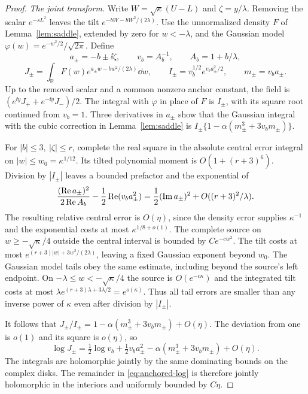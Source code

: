 \begin{proof}
\emph{The joint transform.}
Write \(W=\sqrt\kappa(U-L)\) and \(\zeta=y/\lambda\). Removing the scalar
\(e^{-sL^2}\) leaves the tilt \(e^{-bW-bW^2/(2\lambda)}\).
Use the unnormalized density \(F\) of Lemma~\ref{lem:saddle}, extended by
zero for \(w<-\lambda\), and the Gaussian model
\(\varphi(w)=e^{-w^2/2}/\sqrt{2\pi}\). Define
\[
 a_\pm=-b\pm\ii\zeta,\qquad v_b=A_b^{-1},\qquad A_b=1+b/\lambda,
\]
\[
 J_\pm=\int_{\mathbb R} F(w)e^{a_\pm w-bw^2/(2\lambda)}\dd w,
 \qquad I_\pm=v_b^{1/2}e^{v_ba_\pm^2/2},\qquad m_\pm=v_b a_\pm .
\]
Up to the removed scalar and a common nonzero anchor constant, the field is
\((e^{\ii y}J_++e^{-\ii y}J_-)/2\).
The integral with \(\varphi\) in place of \(F\) is \(I_\pm\), with its square
root continued from \(v_b=1\). Three derivatives in \(a_\pm\) show that
the Gaussian integral with the cubic correction in Lemma~\ref{lem:saddle}
is \(I_\pm\{1-\alpha(m_\pm^3+3v_bm_\pm)\}\).

For \(|b|\le3,\ |\zeta|\le r\), complete the real square in the absolute
central error integral on \(|w|\le w_0=\kappa^{1/12}\). Its tilted polynomial
moment is \(O(1+(r+3)^6)\). Division by \(|I_\pm|\) leaves a bounded
prefactor and the exponential of
\[
 \frac{(\operatorname{Re} a_\pm)^2}{2\operatorname{Re} A_b}-\frac12\operatorname{Re}(v_ba_\pm^2)
 =\frac12(\operatorname{Im} a_\pm)^2+O((r+3)^2/\lambda).
\]
The resulting relative central error is \(O(\eta)\), since the density
error supplies \(\kappa^{-1}\) and the exponential costs at most
\(\kappa^{1/8+o(1)}\). The complete source on \(w\ge-\sqrt\kappa/4\)
outside the central interval is bounded by \(Ce^{-cw^2}\). The tilt
costs at most \(e^{(r+3)|w|+3w^2/(2\lambda)}\), leaving a fixed Gaussian
exponent beyond \(w_0\). The Gaussian model tails obey the same estimate,
including beyond the source's left endpoint. On
\(-\lambda\le w<-\sqrt\kappa/4\) the source is \(O(e^{-c\kappa})\) and
the integrated tilt costs at most
\(\lambda e^{(r+3)\lambda+3\lambda/2}=e^{o(\kappa)}\).
Thus all tail errors are smaller than any inverse power of \(\kappa\)
even after division by \(|I_\pm|\).

It follows that \(J_\pm/I_\pm=1-\alpha(m_\pm^3+3v_bm_\pm)+O(\eta)\). The deviation
from one is \(o(1)\) and its square is \(o(\eta)\), so
\begin{equation}\label{eq:anchored-log}
 \log J_\pm=\tfrac12\log v_b+\tfrac12 v_ba_\pm^2
                  -\alpha(m_\pm^3+3v_bm_\pm)+O(\eta).
\end{equation}
The integrals are holomorphic jointly by the same dominating bounds on
the complex disks. The remainder in \eqref{eq:anchored-log} is therefore
jointly holomorphic in the interiors and uniformly bounded by \(C\eta\).


\end{proof}
